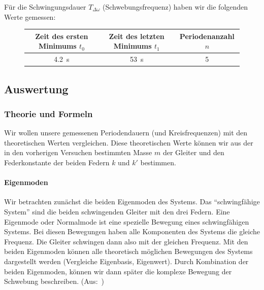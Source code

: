 \documentclass{article}
\begin{document}
              Für die Schwingungsdauer \(T_{\Delta \omega}\) (Schwebungsfrequenz) haben wir die folgenden Werte gemessen:
              \begin{figure}[ht]
                  \centering
                  \begin{tabular}{|c | c | c|}
                      \hline
                      Zeit des ersten Minimums \(t_0\) & Zeit des letzten Minimums \(t_1\) & Periodenanzahl \(n\) \\
                      \hline
                      \SI{4.2}{\second}                & \SI{53}{\second}                  & 5 \\
                      \hline
                  \end{tabular}
              \end{figure}

      \subsection{Auswertung}
          \subsubsection{Theorie und Formeln}
              Wir wollen unsere gemessenen Periodendauern (und Kreisfrequenzen) mit den theoretischen Werten vergleichen.
              Diese theoretischen Werte können wir aus der in den vorherigen Versuchen bestimmten Masse \( m \) der Gleiter und den Federkonstante
              der beiden Federn \( k \) und \( k' \) bestimmen.

              \paragraph{Eigenmoden}
                  Wir betrachten zunächst die beiden Eigenmoden des Systems.
                  Das \enquote{schwingfähige System} sind die beiden schwingenden Gleiter mit den drei Federn.
                  Eine Eigenmode oder Normalmode ist eine spezielle Bewegung eines schwingfähigen Systems.
                  Bei diesen Bewegungen haben alle Komponenten des Systems die gleiche Frequenz. Die Gleiter schwingen dann also mit der gleichen Frequenz.
                  Mit den beiden Eigenmoden können alle theoretisch möglichen Bewegungen des Systems dargestellt werden (Vergleiche Eigenbasis, Eigenwert).
                  Durch Kombination der beiden Eigenmoden, können wir dann später die komplexe Bewegung der Schwebung beschreiben. (Aus:~\cite{Eigenmode})
\end{document}

